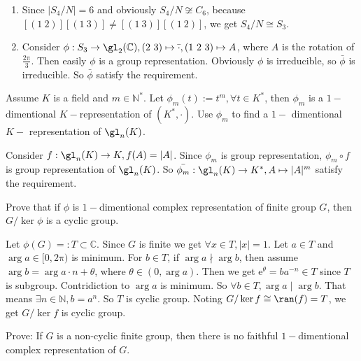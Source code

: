 \documentclass{ctexart}
\begin{document}
\begin{solution}
 \begin{enumerate}
  \item Since $|S_4/N|=6$ and obviously $S_4/N\not\cong C_6$, because $[(1\ 2)][(1\ 3)]\neq [(1\ 3)][(1\ 2)]$, we get $S_4/N\cong S_3$. 
  \item Consider $\phi: S_3\to \gl_2(\mathbb{C}),(2\ 3)\mapsto \bar{\cdot},(1\ 2\ 3)\mapsto A$, where $A$ is the rotation of $\frac{2 \mathrm{\pi}}{3}$. Then easily $\phi$ is a group representation. 
  Obviously $\phi$ is irreducible, so $\bar{\phi}$ is irreducible. So $\bar{\phi}$ satisfy the requirement. 
 \end{enumerate}
\end{solution}

\begin{problem}
 Assume $K$ is a field and $m\in \mathbb{N}^*$. Let $\phi_m(t):=t^m,\forall t\in K^*$, then $\phi_m$ is a $1-$dimentional $K-$representation of $(K^*,\cdot)$. Use $\phi_m$ to find a $1-$ dimentional $K-$ representation of $\gl_n(K)$. 
\end{problem}

\begin{solution}
 Consider $f:\gl_n(K)\to K,f(A)=|A|$. Since $\phi_m$ is group representation, $\phi_m \circ f$ is group representation of $\gl_n(K)$. So $\bar{\phi_m}:\gl_n(K)\to K^*,A\mapsto |A|^m$ satisfy the requirement. 
\end{solution}

\begin{problem}
 Prove that if $\phi$ is $1-$dimentional complex representation of finite group $G$, then $G/\ker\phi$ is a cyclic group. 
\end{problem}

\begin{solution}
 Let $\phi(G)=:T\subset \mathbb{C}$. Since $G$ is finite we get $\forall x\in T,|x|=1$. Let $a\in T$ and $\arg a\in [0,2 \mathrm{\pi})$ is minimum. For $b\in T$, if $\arg a\nmid \arg b$, then assume $\arg b=\arg a \cdot n+\theta$, where $\theta\in (0,\arg a)$. Then we get $\mathrm{e}^{\theta}=ba^{-n}\in T$ since $T$ is subgroup. Contridiction to $\arg a$ is minimum. So $\forall b\in T,\arg a \mid \arg b$. That means $\exists n\in \mathbb{N},b=a^n$. So $T$ is cyclic group. Noting $G/\ker f\cong \ran(f)=T$, we get $G/\ker f$ is cyclic group. 
\end{solution}

\begin{problem}
 Prove: If $G$ is a non-cyclic finite group, then there is no faithful $1-$dimentional complex representation of $G$. 
\end{problem}
\end{document}
